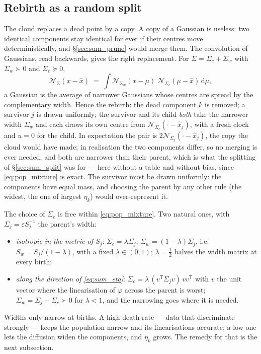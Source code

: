 \documentclass[11pt,a4paper]{article}
\newcommand{\dd}{\,\mathrm{d}}
\newcommand{\T}{^{\mathsf T}}
\newcommand{\xh}{\hat{x}}
\newcommand{\eps}{\varepsilon}
\theoremstyle{plain}
\theoremstyle{definition}
\theoremstyle{remark}
\begin{document}
\subsection{Rebirth as a random split}
\label{sec:pop_split}

The cloud replaces a dead point by a copy. A copy of a Gaussian is useless: two identical components stay identical for ever if their centres move deterministically, and \S\ref{sec:sum_prune} would merge them. The convolution of Gaussians, read backwards, gives the right replacement. For $\Sigma=\Sigma_c+\Sigma_w$ with $\Sigma_w\succ0$ and $\Sigma_c\succeq0$,
\begin{equation}
  \mathcal N_\Sigma(x-\xh) \;=\; \int \mathcal N_{\Sigma_w}(x-\mu)\;\mathcal N_{\Sigma_c}(\mu-\xh)\dd\mu ,
  \label{eq:pop_mixture}
\end{equation}
a Gaussian is the average of narrower Gaussians whose centres are spread by the complementary width. Hence the rebirth: the dead component $k$ is removed; a survivor $j$ is drawn uniformly; the survivor and its child \emph{both} take the narrower width $\Sigma_w$ and each draws its own centre from $\mathcal N_{\Sigma_c}(\cdot-\xh_j)$, with a fresh clock and $u=0$ for the child. In expectation the pair is $2\mathcal N_{\Sigma_j}(\cdot-\xh_j)$, the copy the cloud would have made; in realisation the two components differ, so no merging is ever needed; and both are narrower than their parent, which is what the splitting of \S\ref{sec:sum_split} was for --- here without a table and without bias, since \eqref{eq:pop_mixture} is exact. The survivor must be drawn uniformly: the components have equal mass, and choosing the parent by any other rule (the widest, the one of largest $\eta_k$) would over-represent it.

The choice of $\Sigma_c$ is free within \eqref{eq:pop_mixture}. Two natural ones, with $\Sigma_j=\eps S_j^{-1}$ the parent's width:
\begin{itemize}[nosep]
  \item \emph{isotropic in the metric of $S_j$}: $\Sigma_c=\lambda\Sigma_j$, $\Sigma_w=(1-\lambda)\Sigma_j$, i.e.\ $S_w=S_j/(1-\lambda)$, with a fixed $\lambda\in(0,1)$; $\lambda=\tfrac12$ halves the width matrix at every birth;
  \item \emph{along the direction of \eqref{eq:sum_eta}}: $\Sigma_c=\lambda\,(v\T\Sigma_jv)\,vv\T$ with $v$ the unit vector where the linearisation of $\varphi$ across the parent is worst; $\Sigma_w=\Sigma_j-\Sigma_c\succ0$ for $\lambda<1$, and the narrowing goes where it is needed.
\end{itemize}
Widths only narrow at births. A high death rate --- data that discriminate strongly --- keeps the population narrow and its linearisations accurate; a low one lets the diffusion widen the components, and $\eta_k$ grows. The remedy for that is the next subsection.
\end{document}
